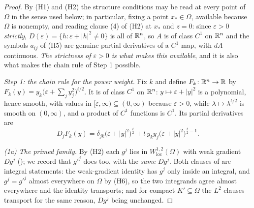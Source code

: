 \begin{proof}
By (H1) and (H2) the structure conditions may be read at every point of
$\Omega$ in the sense used below; in particular, fixing a point $x_\ast\in\Omega$,
available because $\Omega$ is nonempty, and reading clause (4) of (H2) at
$x_\ast$ and $z=0$: since $\varepsilon>0$ \emph{strictly},
$D(\varepsilon)=\{h:\varepsilon+|h|^2\ne0\}$ is all of $\mathbb{R}^n$, so $A$ is of
class $C^1$ on $\mathbb{R}^n$ and the symbols $a_{ij}$ of (H5) are genuine partial
derivatives of a $C^1$ map, with $dA$ continuous.  \emph{The strictness of
$\varepsilon>0$ is what makes this available}, and it is also what makes the
chain rule of Step 1 possible.

\emph{Step 1: the chain rule for the power weight.}  Fix $k$ and define
$F_k\colon\mathbb{R}^n\to\mathbb{R}$ by
$F_k(y)=y_k\bigl(\varepsilon+\sum_jy_j^2\bigr)^{t/2}$.  It is of class $C^1$ on
$\mathbb{R}^n$: $y\mapsto\varepsilon+|y|^2$ is a polynomial, hence smooth, with values
in $[\varepsilon,\infty)\subseteq(0,\infty)$ because $\varepsilon>0$, while
$\lambda\mapsto\lambda^{t/2}$ is smooth on $(0,\infty)$, and a product of $C^1$
functions is $C^1$.  Its partial derivatives are
\[
D_jF_k(y)=\delta_{jk}\bigl(\varepsilon+|y|^2\bigr)^{\frac t2}
+t\,y_ky_j\bigl(\varepsilon+|y|^2\bigr)^{\frac t2-1}.
\]

\emph{(1a) The primed family.}  By (H2) each $g^j$ lies in
$W^{1,2}_{\mathrm{loc}}(\Omega)$ with weak gradient $Dg^j$
(); we record that $g'^j$ does too, with the \emph{same}
$Dg^j$.  Both clauses of  are integral statements: the
weak-gradient identity has $g^j$ only inside an integral, and $g^j=g'^j$ almost
everywhere on $\Omega$ by (H6), so the two integrands agree almost everywhere
and the identity transports; and for compact $K'\subseteq\Omega$ the $L^2$
clauses transport for the same reason, $Dg^j$ being unchanged.


\end{proof}
